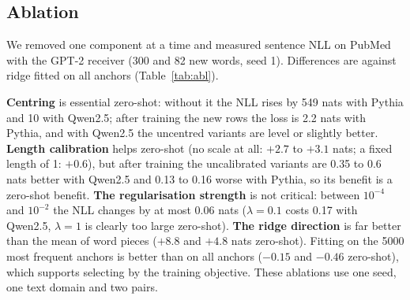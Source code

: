 \documentclass[preprint,12pt]{elsarticle}
\begin{document}
\subsection{Ablation}
\label{sec:ablation}
We removed one component at a time and measured sentence NLL on PubMed with the GPT-2 receiver (300 and 82 new words, seed 1). Differences are against ridge fitted on all anchors (Table~\ref{tab:abl}).
\begin{table}[t]
\centering\small
\caption{Ablations (nats per sentence; positive = the ablation is worse than ridge on all anchors). $^{*}$ 95\,\% interval excludes 0. First row: full ridge against the unchanged receiver.}
\label{tab:abl}
\resizebox{\textwidth}{!}{}
\end{table}
\textbf{Centring} is essential zero-shot: without it the NLL rises by 549 nats with Pythia and 10 with Qwen2.5; after training the new rows the loss is 2.2 nats with Pythia, and with Qwen2.5 the uncentred variants are level or slightly better. \textbf{Length calibration} helps zero-shot (no scale at all: $+2.7$ to $+3.1$ nats; a fixed length of 1: $+0.6$), but after training the uncalibrated variants are 0.35 to 0.6 nats better with Qwen2.5 and 0.13 to 0.16 worse with Pythia, so its benefit is a zero-shot benefit. \textbf{The regularisation strength} is not critical: between $10^{-4}$ and $10^{-2}$ the NLL changes by at most 0.06 nats ($\lambda=0.1$ costs 0.17 with Qwen2.5, $\lambda=1$ is clearly too large zero-shot). \textbf{The ridge direction} is far better than the mean of word pieces ($+8.8$ and $+4.8$ nats zero-shot). Fitting on the 5000 most frequent anchors is better than on all anchors ($-0.15$ and $-0.46$ zero-shot), which supports selecting by the training objective. These ablations use one seed, one text domain and two pairs.
\end{document}
